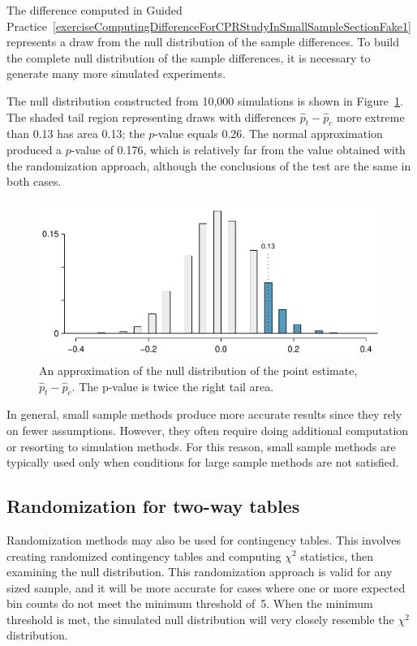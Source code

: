 The difference computed in Guided Practice~\ref{exerciseComputingDifferenceForCPRStudyInSmallSampleSectionFake1} represents a draw from the null distribution of the sample differences. To build the complete null distribution of the sample differences, it is necessary to generate many more simulated experiments.

The null distribution constructed from 10,000 simulations is shown in Figure~\ref{pValueCPRStudySmallSampleAnalysisInSmallSampleSection}. The shaded tail region representing draws with differences $\hat{p}_t - \hat{p}_c$ more extreme than 0.13 has area 0.13; the $p$-value equals 0.26. The normal approximation produced a $p$-value of 0.176, which is relatively far from the value obtained with the randomization approach, although the conclusions of the test are the same in both cases. 

\begin{figure}[ht]
\centering
\includegraphics[width=\textwidth]{ch_inference_for_props_oi_biostat/figures/pValueCPRStudySmallSampleAnalysisInSmallSampleSection/pValueCPRStudySmallSampleAnalysisInSmallSampleSection}
\caption{An approximation of the null distribution of the point estimate, $\hat{p}_t - \hat{p}_c$. The p-value is twice the right tail area.}
\label{pValueCPRStudySmallSampleAnalysisInSmallSampleSection}
\end{figure}

In general, small sample methods produce more accurate results since they rely on fewer assumptions. However, they often require doing additional computation or resorting to simulation methods. For this reason, small sample methods are typically used only when conditions for large sample methods are not satisfied.

\subsection{Randomization for two-way tables}

Randomization methods may also be used for contingency tables. This involves creating randomized contingency tables and computing $\chi^2$ statistics, then examining the null distribution. This randomization approach is valid for any sized sample, and it will be more accurate for cases where one or more expected bin counts do not meet the minimum threshold of~5. When the minimum threshold is met, the simulated null distribution will very closely resemble the $\chi^2$ distribution. 
